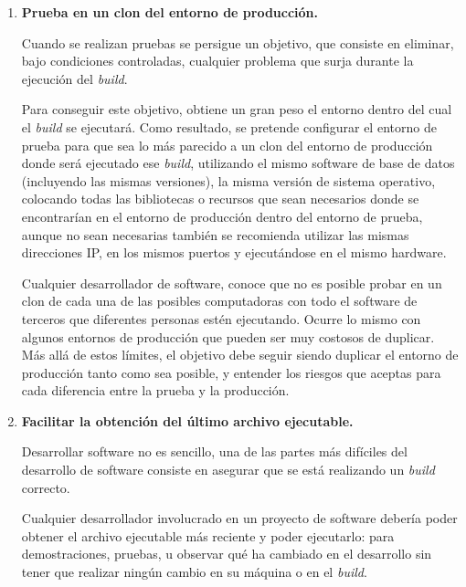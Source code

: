 \begin{enumerate}

\item \textbf{Prueba en un clon del entorno de producción.}

Cuando se realizan pruebas se persigue un objetivo, que consiste en eliminar, bajo condiciones controladas, cualquier problema que surja durante la ejecución del \textit{build}.

Para conseguir este objetivo, obtiene un gran peso el entorno dentro del cual el \textit{build} se ejecutará. Como resultado, se pretende configurar el entorno de prueba para que sea lo más parecido a un clon del entorno de producción donde será ejecutado ese \textit{build}, utilizando el mismo software de base de datos (incluyendo las mismas versiones), la misma versión de sistema operativo, colocando todas las bibliotecas o recursos que sean necesarios donde se encontrarían en el entorno de producción dentro del entorno de prueba, aunque no sean necesarias también se recomienda utilizar las mismas direcciones IP, en los mismos puertos y ejecutándose en el mismo hardware.

Cualquier desarrollador de software, conoce que no es posible probar en un clon de cada una de las posibles computadoras con todo el software de terceros que diferentes personas estén ejecutando. Ocurre lo mismo con algunos entornos de producción que pueden ser muy costosos de duplicar. Más allá de estos límites, el objetivo debe seguir siendo duplicar el entorno de producción tanto como sea posible, y entender los riesgos que aceptas para cada diferencia entre la prueba y la producción.


\item \textbf{Facilitar la obtención del último archivo ejecutable.}

Desarrollar software no es sencillo, una de las partes más difíciles del desarrollo de software consiste en asegurar que se está realizando un \textit{build} correcto.

Cualquier desarrollador involucrado en un proyecto de software debería poder obtener el archivo ejecutable más reciente y poder ejecutarlo: para demostraciones, pruebas, u observar qué ha cambiado en el desarrollo sin tener que realizar ningún cambio en su máquina o en el \textit{build}.


\end{enumerate}

